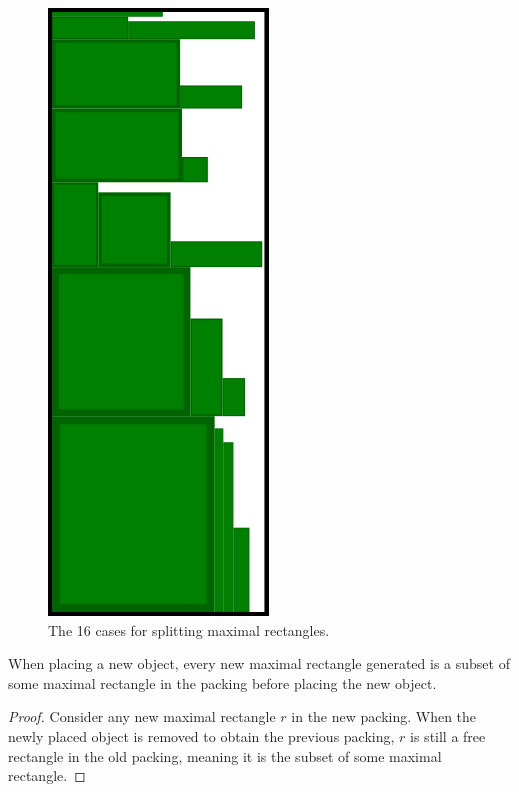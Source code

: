 \documentclass{article}
\begin{document}
\begin{defn}
\begin{defn}
\begin{figure}[!h]
  \centering
  \includegraphics[width=.5\linewidth]{FFDHrun.png}
  \caption{The 16 cases for splitting maximal rectangles.}
  \label{fig:maxrectsplitting}
\end{figure}

\begin{thm}
\label{thm:maxrectgeneration}
When placing a new object, every new maximal rectangle generated is a subset of some maximal rectangle in the packing before placing the new object.
\end{thm}
\begin{proof}
Consider any new maximal rectangle $r$ in the new packing. When the newly placed object is removed to obtain the previous packing, $r$ is still a free rectangle in the old packing, meaning it is the subset of some maximal rectangle.
\end{proof}


\end{defn}
\end{defn}
\end{document}
